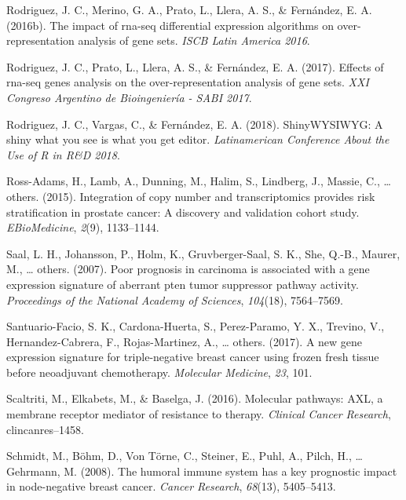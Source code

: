 \documentclass[12pt,twoside]{reedthesis}
\begin{document}
\leavevmode\hypertarget{ref-rodrigueziscb}{}%
Rodriguez, J. C., Merino, G. A., Prato, L., Llera, A. S., \& Fernández, E. A. (2016b). The impact of rna-seq differential expression algorithms on over-representation analysis of gene sets. \emph{ISCB Latin America 2016}.

\leavevmode\hypertarget{ref-rodriguezsabi}{}%
Rodriguez, J. C., Prato, L., Llera, A. S., \& Fernández, E. A. (2017). Effects of rna-seq genes analysis on the over-representation analysis of gene sets. \emph{XXI Congreso Argentino de Bioingeniería - SABI 2017}.

\leavevmode\hypertarget{ref-rodriguezlatinr}{}%
Rodriguez, J. C., Vargas, C., \& Fernández, E. A. (2018). ShinyWYSIWYG: A shiny what you see is what you get editor. \emph{Latinamerican Conference About the Use of R in R\&D 2018}.

\leavevmode\hypertarget{ref-ross2015integration}{}%
Ross-Adams, H., Lamb, A., Dunning, M., Halim, S., Lindberg, J., Massie, C., \ldots{} others. (2015). Integration of copy number and transcriptomics provides risk stratification in prostate cancer: A discovery and validation cohort study. \emph{EBioMedicine}, \emph{2}(9), 1133--1144.

\leavevmode\hypertarget{ref-saal2007poor}{}%
Saal, L. H., Johansson, P., Holm, K., Gruvberger-Saal, S. K., She, Q.-B., Maurer, M., \ldots{} others. (2007). Poor prognosis in carcinoma is associated with a gene expression signature of aberrant pten tumor suppressor pathway activity. \emph{Proceedings of the National Academy of Sciences}, \emph{104}(18), 7564--7569.

\leavevmode\hypertarget{ref-santuario2017new}{}%
Santuario-Facio, S. K., Cardona-Huerta, S., Perez-Paramo, Y. X., Trevino, V., Hernandez-Cabrera, F., Rojas-Martinez, A., \ldots{} others. (2017). A new gene expression signature for triple-negative breast cancer using frozen fresh tissue before neoadjuvant chemotherapy. \emph{Molecular Medicine}, \emph{23}, 101.

\leavevmode\hypertarget{ref-scaltriti2016molecular}{}%
Scaltriti, M., Elkabets, M., \& Baselga, J. (2016). Molecular pathways: AXL, a membrane receptor mediator of resistance to therapy. \emph{Clinical Cancer Research}, clincanres--1458.

\leavevmode\hypertarget{ref-schmidt2008humoral}{}%
Schmidt, M., Böhm, D., Von Törne, C., Steiner, E., Puhl, A., Pilch, H., \ldots{} Gehrmann, M. (2008). The humoral immune system has a key prognostic impact in node-negative breast cancer. \emph{Cancer Research}, \emph{68}(13), 5405--5413.
\end{document}
